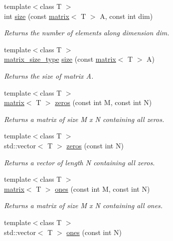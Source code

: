 \begin{DoxyCompactItemize}
\item 
{\footnotesize template$<$class T $>$ }\\int \hyperlink{namespacekeycpp_a2dc5102775ed955f378432f84fe96987}{size} (const \hyperlink{classkeycpp_1_1matrix}{matrix}$<$ T $>$ A, const int dim)
\begin{DoxyCompactList}\small\item\em Returns the number of elements along dimension dim. \end{DoxyCompactList}\item 
{\footnotesize template$<$class T $>$ }\\\hyperlink{structkeycpp_1_1matrix__size__type}{matrix\-\_\-size\-\_\-type} \hyperlink{namespacekeycpp_a028e501a865c86bdf616ea13e87645fa}{size} (const \hyperlink{classkeycpp_1_1matrix}{matrix}$<$ T $>$ A)
\begin{DoxyCompactList}\small\item\em Returns the size of matrix A. \end{DoxyCompactList}\item 
{\footnotesize template$<$class T $>$ }\\\hyperlink{classkeycpp_1_1matrix}{matrix}$<$ T $>$ \hyperlink{namespacekeycpp_a86f1406f9fad5a439d8eff01aba8eac6}{zeros} (const int M, const int N)
\begin{DoxyCompactList}\small\item\em Returns a matrix of size M x N containing all zeros. \end{DoxyCompactList}\item 
{\footnotesize template$<$class T $>$ }\\std\-::vector$<$ T $>$ \hyperlink{namespacekeycpp_a17115c92ffe695fd6ecb002f5ded220a}{zeros} (const int N)
\begin{DoxyCompactList}\small\item\em Returns a vector of length N containing all zeros. \end{DoxyCompactList}\item 
{\footnotesize template$<$class T $>$ }\\\hyperlink{classkeycpp_1_1matrix}{matrix}$<$ T $>$ \hyperlink{namespacekeycpp_ace6f21832ab61f8f15e5b35e0a5cdb3e}{ones} (const int M, const int N)
\begin{DoxyCompactList}\small\item\em Returns a matrix of size M x N containing all ones. \end{DoxyCompactList}\item 
{\footnotesize template$<$class T $>$ }\\std\-::vector$<$ T $>$ \hyperlink{namespacekeycpp_a31175b3ba618b338b185cd02a27addfd}{ones} (const int N)

\end{DoxyCompactItemize}
